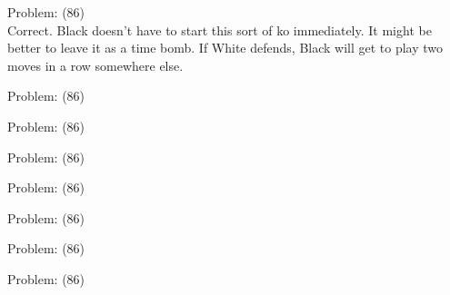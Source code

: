 \documentclass[11pt]{article}
\begin{document}
\begin{minipage}[t]{0.5\textwidth}
  {\centering
  
Problem: (86)\\
Correct. Black doesn't have to start this sort of ko immediately. It might be better to leave it as a time bomb. If White defends, Black will get to play two moves in a row somewhere else.\\
  }
\end{minipage}
\begin{minipage}[t]{0.5\textwidth}
  {\centering
  
Problem: (86)\\
  }
\end{minipage}
\begin{minipage}[t]{0.5\textwidth}
  {\centering
  
Problem: (86)\\
  }
\end{minipage}
\begin{minipage}[t]{0.5\textwidth}
  {\centering
  
Problem: (86)\\
  }
\end{minipage}
\begin{minipage}[t]{0.5\textwidth}
  {\centering
  
Problem: (86)\\
  }
\end{minipage}
\begin{minipage}[t]{0.5\textwidth}
  {\centering
  
Problem: (86)\\
  }
\end{minipage}
\begin{minipage}[t]{0.5\textwidth}
  {\centering
  
Problem: (86)\\
  }
\end{minipage}
\begin{minipage}[t]{0.5\textwidth}
  {\centering
  
Problem: (86)\\
  }
\end{minipage}
\end{document}
